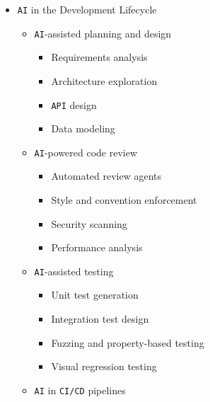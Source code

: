 \documentclass[
]{article}
\providecommand{\tightlist}{%
  \setlength{\itemsep}{0pt}\setlength{\parskip}{0pt}}
\begin{document}
\begin{itemize}
\begin{itemize}
    \begin{itemize}
    \tightlist
    \item
      Short-term conversation memory
    \item
      Long-term persistent memory
    \item
      Project knowledge bases
    \item
      Learning from corrections
    \end{itemize}
  \item
    Agent evaluation and testing

    \begin{itemize}
    \tightlist
    \item
      Benchmarking agent performance
    \item
      Regression testing for agents
    \item
      Monitoring agent behavior in production
    \end{itemize}
  \end{itemize}
\item
  \texttt{AI} in the Development Lifecycle

  \begin{itemize}
  \tightlist
  \item
    \texttt{AI}-assisted planning and design

    \begin{itemize}
    \tightlist
    \item
      Requirements analysis
    \item
      Architecture exploration
    \item
      \texttt{API} design
    \item
      Data modeling
    \end{itemize}
  \item
    \texttt{AI}-powered code review

    \begin{itemize}
    \tightlist
    \item
      Automated review agents
    \item
      Style and convention enforcement
    \item
      Security scanning
    \item
      Performance analysis
    \end{itemize}
  \item
    \texttt{AI}-assisted testing

    \begin{itemize}
    \tightlist
    \item
      Unit test generation
    \item
      Integration test design
    \item
      Fuzzing and property-based testing
    \item
      Visual regression testing
    \end{itemize}
  \item
    \texttt{AI} in \texttt{CI/CD} pipelines


\end{itemize}
\end{itemize}
\end{document}
